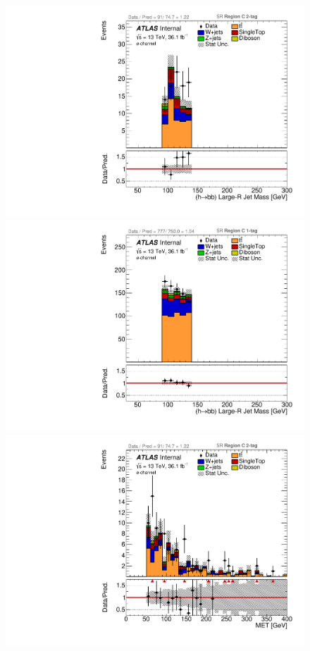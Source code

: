 \begin{figure}[!htbp]
\begin{center}
\includegraphics[scale=0.33]{./figures/boosted/ABCD_ScaledPrompt/elec_SR_RegionC_HbbMass}
\includegraphics[scale=0.33]{./figures/boosted/ABCD_ScaledPrompt/elec_SR_RegionC_1tag_HbbMass}\\
\includegraphics[scale=0.33]{./figures/boosted/ABCD_ScaledPrompt/elec_SR_RegionC_MET}

\end{center}
\end{figure}
